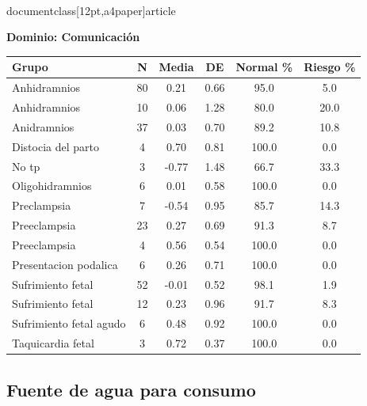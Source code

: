 \\documentclass[12pt,a4paper]{article}
\begin{document}
\textbf{Dominio: Comunicación}


\begin{center}
\begin{tabular}{|l|c|c|c|c|c|}
\hline
\textbf{Grupo} & \textbf{N} & \textbf{Media} & \textbf{DE} & \textbf{Normal \%} & \textbf{Riesgo \%} \\
\hline
Anhidramnios & 80 & 0.21 & 0.66 & 95.0 & 5.0 \\
Anhidramnios  & 10 & 0.06 & 1.28 & 80.0 & 20.0 \\
Anidramnios & 37 & 0.03 & 0.70 & 89.2 & 10.8 \\
Distocia del parto & 4 & 0.70 & 0.81 & 100.0 & 0.0 \\
No tp & 3 & -0.77 & 1.48 & 66.7 & 33.3 \\
Oligohidramnios & 6 & 0.01 & 0.58 & 100.0 & 0.0 \\
Preclampsia  & 7 & -0.54 & 0.95 & 85.7 & 14.3 \\
Preeclampsia & 23 & 0.27 & 0.69 & 91.3 & 8.7 \\
Preeclampsia  & 4 & 0.56 & 0.54 & 100.0 & 0.0 \\
Presentacion podalica & 6 & 0.26 & 0.71 & 100.0 & 0.0 \\
Sufrimiento fetal & 52 & -0.01 & 0.52 & 98.1 & 1.9 \\
Sufrimiento fetal  & 12 & 0.23 & 0.96 & 91.7 & 8.3 \\
Sufrimiento fetal agudo & 6 & 0.48 & 0.92 & 100.0 & 0.0 \\
Taquicardia fetal & 3 & 0.72 & 0.37 & 100.0 & 0.0 \\

\hline
\end{tabular}
\end{center}


\vspace{0.5cm}


\subsection{Fuente de agua para consumo}
\end{document}

